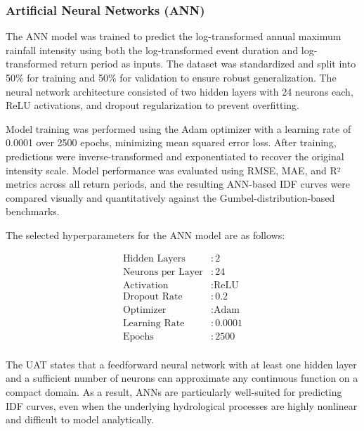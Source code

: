 \subsubsection{Artificial Neural Networks (ANN)}

The ANN model was trained to predict the log-transformed annual maximum rainfall intensity using both the log-transformed event duration and log-transformed return period as inputs. The dataset was standardized and split into 50\% for training and 50\% for validation to ensure robust generalization. The neural network architecture consisted of two hidden layers with 24 neurons each, ReLU activations, and dropout regularization to prevent overfitting.

\vspace{1em}

Model training was performed using the Adam optimizer with a learning rate of 0.0001 over 2500 epochs, minimizing mean squared error loss. After training, predictions were inverse-transformed and exponentiated to recover the original intensity scale. Model performance was evaluated using RMSE, MAE, and R² metrics across all return periods, and the resulting ANN-based IDF curves were compared visually and quantitatively against the Gumbel-distribution-based benchmarks.

\vspace{1em}

The selected hyperparameters for the ANN model are as follows:

\begin{align*}
\text{Hidden Layers} &: 2 \\
\text{Neurons per Layer} &: 24 \\
\text{Activation} &: \text{ReLU} \\
\text{Dropout Rate} &: 0.2 \\
\text{Optimizer} &: \text{Adam} \\
\text{Learning Rate} &: 0.0001 \\
\text{Epochs} &: 2500 \\
\end{align*}

The UAT states that a feedforward neural network with at least one hidden layer and a sufficient number of neurons can approximate any continuous function on a compact domain. As a result, ANNs are particularly well-suited for predicting IDF curves, even when the underlying hydrological processes are highly nonlinear and difficult to model analytically.
